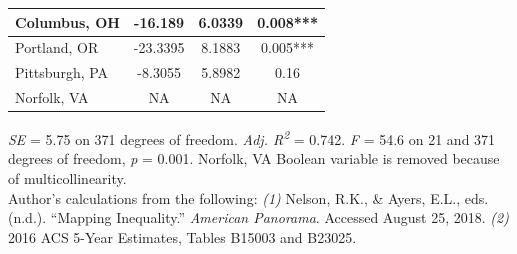 \documentclass[paper=letter, fontsize=12pt]{scrartcl} %
\begin{document}
\begin{table}
\begin{center}
\begin{tabular}{|| l | c c c ||}
			\hline 
			Columbus, OH & -16.189 & 6.0339 & 0.008***\\ 
			\hline 
			Portland, OR & -23.3395 & 8.1883 & 0.005***\\ 
			\hline 
			Pittsburgh, PA & -8.3055 & 5.8982 & 0.16\\ 
			\hline 
			Norfolk, VA & NA & NA & NA\\ 
			\hline
		\end{tabular}
	\end{center}
\textit{SE} = 5.75 on 371 degrees of freedom. \textit{Adj. R\textsuperscript{2}} = 0.742. \textit{F} = 54.6 on 21 and 371 degrees of freedom, \textit{p} = 0.001. Norfolk, VA Boolean variable is removed because of multicollinearity.\\
Author's calculations from the following: \textit{(1)} Nelson, R.K., \& Ayers, E.L., eds. (n.d.). ``Mapping Inequality.'' \textit{American Panorama}. Accessed August 25, 2018. \textit{(2)} 2016 ACS 5-Year Estimates, Tables B15003 and B23025.
\end{table}
\end{document}

